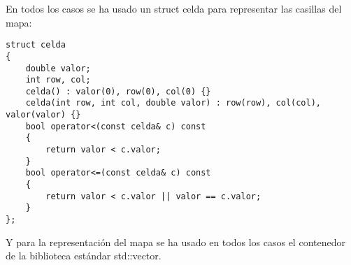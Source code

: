 En todos los casos se ha usado un struct celda para representar las casillas del mapa:
\begin{lstlisting}
struct celda
{
    double valor;
    int row, col;
    celda() : valor(0), row(0), col(0) {}
    celda(int row, int col, double valor) : row(row), col(col), valor(valor) {}
    bool operator<(const celda& c) const
    {
        return valor < c.valor;
    }
    bool operator<=(const celda& c) const
    {
        return valor < c.valor || valor == c.valor; 
    }
};
\end{lstlisting}
Y para la representaci\'on del mapa se ha usado en todos los casos el contenedor de la biblioteca est\'andar std::vector.